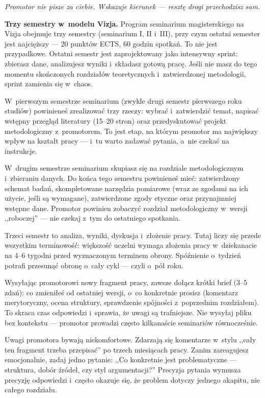 \documentclass[12pt,a4paper,twoside,openany]{book}
\newcommand{\pullquote}[1]{%
  \par\vspace{12pt}\noindent
  \begin{tcolorbox}[blanker, breakable, left=2.2em, right=1em, top=2pt, bottom=2pt,
    borderline west={2.5pt}{0pt}{accent}]
    {\color{chaptercolor}\Large\itshape #1}
  \end{tcolorbox}\vspace{10pt}\par
}
\begin{document}
\pullquote{Promotor nie pisze za ciebie. Wskazuje kierunek --- resztę drogi przechodzisz sam.}

\textbf{Trzy semestry w~modelu Vizja.} Program seminarium magisterskiego na Vizja obejmuje trzy semestry (seminarium I, II i~III), przy czym ostatni semester jest najcięższy --- 20 punktów ECTS, 60 godzin spotkań. To nie jest przypadkowe. Ostatni semestr jest zaprojektowany jako intensywny sprint: zbierasz dane, analizujesz wyniki i~składasz gotową pracę. Jeśli nie masz do tego momentu skończonych rozdziałów teoretycznych i~zatwierdzonej metodologii, sprint zamienia się w~chaos.

W~pierwszym semestrze seminarium (zwykle drugi semestr pierwszego roku studiów) powinieneś zrealizować trzy rzeczy: wybrać i~zatwierdzić temat, napisać wstępny przegląd literatury (15--20 stron) oraz przedyskutować projekt metodologiczny z~promotorem. To jest etap, na którym promotor ma największy wpływ na kształt pracy --- i~tu warto zadawać pytania, a~nie czekać na instrukcje.

W~drugim semestrze seminarium skupiasz się na rozdziale metodologicznym i~zbieraniu danych. Do końca tego semestru powinieneś mieć: zatwierdzony schemat badań, skompletowane narzędzia pomiarowe (wraz ze zgodami na ich użycie, jeśli są wymagane), zatwierdzone zgody etyczne oraz przynajmniej wstępne dane. Promotor powinien zobaczyć rozdział metodologiczny w~wersji ,,roboczej'' --- nie czekaj z~tym do ostatniego spotkania.

Trzeci semestr to analiza, wyniki, dyskusja i~złożenie pracy. Tutaj liczy się przede wszystkim terminowość: większość uczelni wymaga złożenia pracy w~dziekanacie na 4--6 tygodni przed wyznaczonym terminem obrony. Spóźnienie o~tydzień potrafi przesunąć obronę o~cały cykl --- czyli o~pół roku.

\begin{tipbox}
Wysyłając promotorowi nowy fragment pracy, zawsze dołącz krótki brief (3--5 zdań): co zmieniłeś od ostatniej wersji, o~co konkretnie prosisz (komentarz merytoryczny, ocena struktury, sprawdzenie spójności z~poprzednim rozdziałem). To skraca czas odpowiedzi i~sprawia, że uwagi są trafniejsze. Nie wysyłaj pliku bez kontekstu --- promotor prowadzi często kilkanaście seminariów równocześnie.
\end{tipbox}

Uwagi promotora bywają niekomfortowe. Zdarzają się komentarze w~stylu ,,cały ten fragment trzeba przepisać'' po trzech miesiącach pracy. Zanim zareagujesz emocjonalnie, zadaj jedno pytanie: ,,Co konkretnie jest problematyczne --- struktura, dobór źródeł, czy styl argumentacji?'' Precyzja pytania wymusza precyzję odpowiedzi i~często okazuje się, że problem dotyczy jednego akapitu, nie całego rozdziału.
\end{document}
